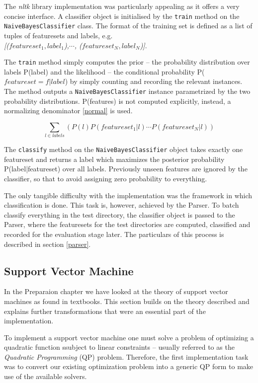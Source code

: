 \documentclass[11pt,twoside,notitlepage]{report}
\begin{document}
The \textit{nltk} library implementation was particularly appealing as it offers a very
concise interface. A classifier object is initialised by the \texttt{train}
method on the \texttt{NaiveBayesClassifier} class. The format of the training
set is defined as a list of tuples of featuresets and labels, e.g.
\\ \textit{[(\(featureset_1, label_1\)),\( \cdots\), (\(featureset_N,
label_N\))]}. 

The \texttt{train} method simply computes the prior -- the probability
distribution over labels P(label) and the likelihood -- the conditional
probability P(\(featureset=f|label\)) by simply counting and recording the
relevant instances. The method outputs a \texttt{NaiveBayesClassifier} instance
parametrized by the two probability distributions. P(features) is not
computed explicitly, instead, a normalizing denominator \ref{normal} is used.

\begin{equation} \sum_{l \in labels}(P(l)P(featureset_1|l)\cdots
  P(featureset_N|l)) \end{equation}

The \texttt{classify} method on the \texttt{NaiveBayesClassifier} object takes
exactly one featureset and returns a label which maximizes the posterior
probability P(label|featureset) over all labels.  Previously unseen features
are ignored by the classifier, so that to avoid assigning zero probability to
everything.

The only tangible difficulty with the implementation was the
framework in which classification is done. This task is, however, achieved by
the Parser.  To batch classify everything in the test directory, the classifier
object is passed to the Parser, where the featuresets for the test directories
are computed, classified and recorded for the evaluation stage later. The
particulars of this process is described in section \ref{parser}.

\subsection{Support Vector Machine} In the Preparaion chapter we have looked at
the theory of support vector machines as found in textbooks. This section
builds on the theory described and explains further transformations that were
an essential part of the implementation.

To implement a support vector
machine one must solve a problem of optimizing a quadratic function ssubject to
linear constraints -- usually referred to as the \textit{Quadratic
Programming} (QP) problem. Therefore, the first implementation task was to
convert our existing optimization problem into a generic QP form to make use of
the available solvers.
\end{document}
